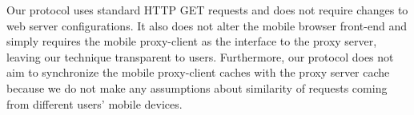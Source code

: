 Our protocol uses standard HTTP GET requests and does not require changes to web server configurations. It also does not alter the mobile browser front-end and simply requires the mobile proxy-client as the interface to the proxy server, leaving our technique transparent to users. Furthermore, our protocol does not aim to synchronize the mobile proxy-client caches with the proxy server cache because we do not make any assumptions about similarity of requests coming from different users' mobile devices.







